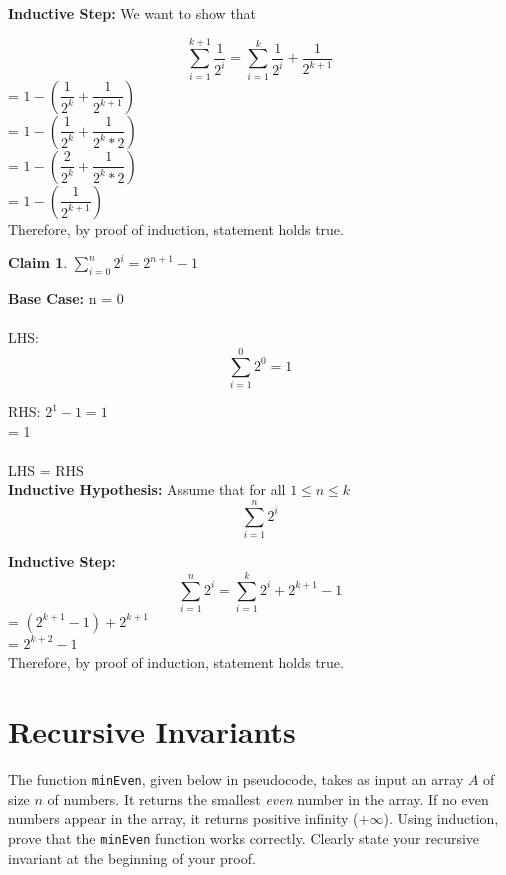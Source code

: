 \documentclass{article}
\newtheorem{claim}{Claim}
\begin{document}
      \textbf{Inductive Step:}
      We want to show that

      \[ \sum_{i=1}^{k+1} \dfrac{1}{2^i} = \sum_{i=1}^{k} \dfrac{1}{2^i}  + \dfrac{1}{2^{k+1}} \]
      = $1- (\dfrac{1}{2^k} + \dfrac{1}{2^{k+1}})$ \\
      = $1- (\dfrac{1}{2^k} + \dfrac{1}{2^k*2})$  \\
      = $1-(\dfrac{2}{2^k}  + \dfrac{1}{2^k*2})$ \\
      = $1-(\dfrac{1}{2^{k+1}})$ \\

      Therefore, by proof of induction, statement holds true.\\


    \begin{claim}
      $\sum\limits_{i=0}^{n} 2^i = 2^{n+1}-1$
    \end{claim}

      \textbf{Base Case:} n = 0\\ \\
      \indent  LHS: \[ \sum_{i=1}^{0} 2^0 = 1 \]

      \indent RHS: $2^1 - 1  = 1$\\

       = 1\\ \\
      \indent LHS = RHS \\

      \textbf{Inductive Hypothesis:} Assume that for all $1 \leq n \leq k$ \\
      \[ \sum_{i=1}^{n} 2^i \]

      \textbf{Inductive Step:} \\
       \[ \sum_{i=1}^{n} 2^i = \sum_{i=1}^{k} 2^i + 2^{k+1} -1 \]
      \indent = $(2^{k+1} -1) + 2^{k+1}$\\
      \indent  = $2^{k+2} -1$ \\

      Therefore, by proof of induction, statement holds true.

    \vspace{1cm}
    \section{Recursive Invariants}

    The function \texttt{minEven}, given below in pseudocode, takes as
    input an array $A$ of size $n$ of numbers.  It returns the
    smallest \textit{even} number in the array.  If no even numbers
    appear in the array, it returns positive infinity ($+\infty$).
    Using induction, prove that the \texttt{minEven} function works
    correctly.  Clearly state your recursive invariant at the
    beginning of your proof.
\end{document}
